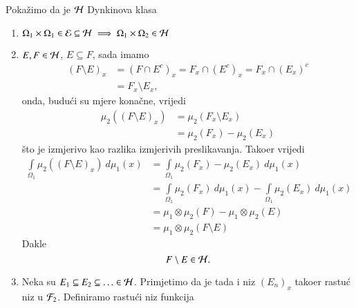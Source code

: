 \begin{rj}[\ref{zad:4.15}]
    Poka\v zimo da je $\mathcal{H}$ Dynkinova klasa
    \begin{enumerate}[label=(\roman*)]
        \item
        $\Omega_1 \times \Omega_1 \in \mathcal{E} \subseteq \mathcal{H} \implies \Omega_1 \times \Omega_2 \in \mathcal{H}$
        \item $E, F \in \mathcal{H}$, $E \subseteq F$, sada imamo
        \begin{equation*}
            \begin{aligned}
                (F \setminus E)_x &= (F \cap E^c)_x = F_x \cap (E^c)_x = F_x \cap (E_x)^c\\
                &= F_x \setminus E_x,
            \end{aligned}
        \end{equation*}
        onda, budu\' ci su mjere kona\v cne, vrijedi
        \begin{equation*}
            \begin{aligned}
                \mu_2 ((F \setminus E)_x) &= \mu_2 (F_x \setminus E_x)\\
                &= \mu_2 (F_x) - \mu_2 (E_x)
            \end{aligned}
        \end{equation*}
        \v sto je izmjerivo kao razlika izmjerivih preslikavanja.
        Tako\dj er vrijedi
        \begin{equation*}
            \begin{aligned}
                \int\limits_{\Omega_1} \mu_2 ((F \setminus E)_x) \: d \mu_1 (x) &= \int\limits_{\Omega_1} \mu_2 (F_x) - \mu_2 (E_x) \: d \mu_1 (x)\\
                &= \int\limits_{\Omega_1} \mu_2 (F_x) \: d \mu_1 (x) - \int\limits_{\Omega_1} \mu_2 (E_x) \: d \mu_1 (x)\\
                &= \mu_1 \otimes \mu_2 (F) - \mu_1 \otimes \mu_2 (E)\\
                &= \mu_1 \otimes \mu_2 (F \setminus E)
            \end{aligned}
        \end{equation*}
        Dakle
        \begin{equation*}
            F \setminus E \in \mathcal{H}.
        \end{equation*}
        \item
        Neka su $E_1 \subseteq E_2 \subseteq \ldots \in \mathcal{H}$.
        Primjetimo da je tada i niz $(E_n)_x$ tako\dj er rastu\' c niz u $\mathcal{F}_2$.
        Definiramo rastu\' ci niz funkcija
        \begin{equation*}

\end{equation*}
\end{enumerate}
\end{rj}
